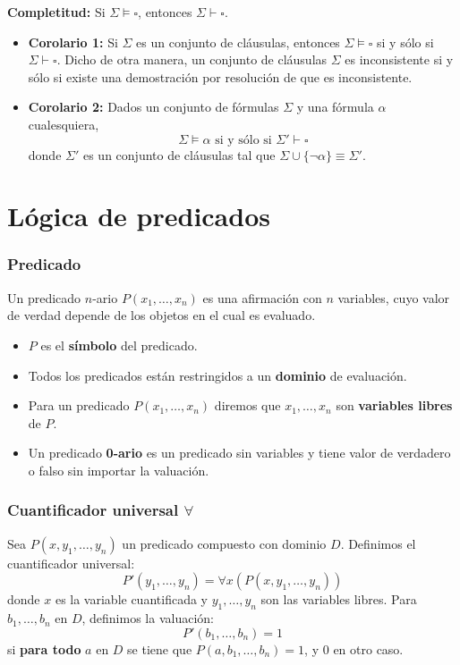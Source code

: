 \begin{multicols}{2}
    \textbf{Completitud:} Si $\Sigma \models \square$, entonces $\Sigma \vdash \square$.
    \begin{itemize}
        \item \textbf{Corolario 1:} Si $\Sigma$ es un conjunto de cláusulas, entonces $\Sigma \models \square$ si y sólo si $\Sigma \vdash \square$. Dicho de otra manera, un conjunto de cláusulas $\Sigma$ es inconsistente si y sólo si existe una demostración por resolución de que es inconsistente.
        \item \textbf{Corolario 2:} Dados un conjunto de fórmulas $\Sigma$ y una fórmula $\alpha$ cualesquiera,
        $$
        \Sigma \models \alpha \text{ si y sólo si } \Sigma' \vdash \square
        $$
        donde $\Sigma'$ es un conjunto de cláusulas tal que $\Sigma \cup \{\neg \alpha\} \equiv \Sigma'$.
    \end{itemize}
    
    \section{Lógica de predicados}
    \subsubsection*{Predicado}
    Un predicado $n$-ario $P(x_1,\ldots,x_n)$ es una afirmación con $n$ variables, cuyo valor de verdad depende de los objetos en el cual es evaluado.
    \begin{itemize}
        \item $P$ es el \textbf{símbolo} del predicado.
        \item Todos los predicados están restringidos a un \textbf{dominio} de evaluación.
        \item Para un predicado $P(x_1,\ldots,x_n)$ diremos que $x_1,\ldots,x_n$ son \textbf{variables libres} de $P$.
        \item Un predicado \textbf{0-ario} es un predicado sin variables y tiene valor de verdadero o falso sin importar la valuación.
    \end{itemize}
    
    \subsubsection*{Cuantificador universal $\forall$}
    Sea $P(x, y_1, \ldots, y_n)$ un predicado compuesto con dominio $D$. Definimos el cuantificador universal:
        $$
        P'(y_1, \ldots, y_n) = \forall x(P(x, y_1, \ldots, y_n))
        $$
        donde $x$ es la variable cuantificada y $y_1, \ldots, y_n$ son las variables libres. Para $b_1, \ldots, b_n$ en $D$, definimos la valuación:
        $$
        P'(b_1, \ldots, b_n) = 1
        $$
        si \textbf{para todo} $a$ en $D$ se tiene que $P(a, b_1, \ldots, b_n) = 1$, y 0 en otro caso.
    

\end{multicols}
